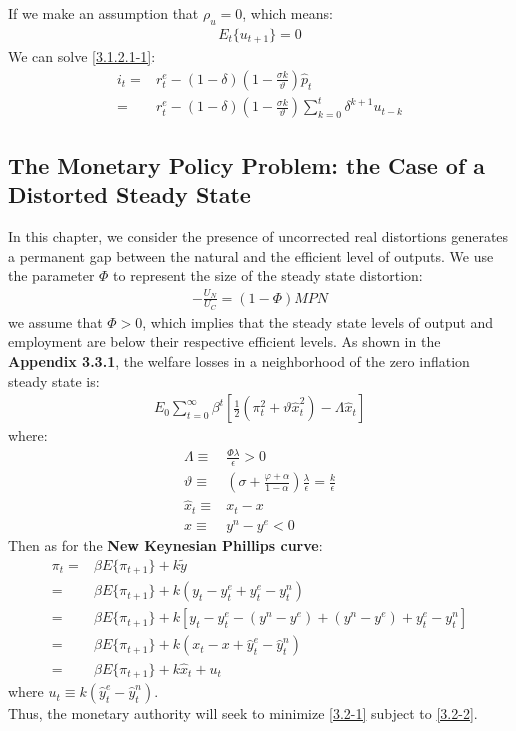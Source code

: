 \documentclass{article}
\numberwithin{equation}{section}
\begin{document}
If we make an assumption that $\rho_u = 0$, which means:
	\begin{align*}
		E_t\{ u_{t+1} \} = 0
	\end{align*}	
We can solve \eqref{3.1.2.1-1}:
	\begin{align*}
		i_t = &r^e_t - (1 - \delta)\left( 1 - \frac{\sigma k}{\vartheta} \right) \hat{p}_t\\
		= &r^e_t - (1 - \delta)\left( 1 - \frac{\sigma k}{\vartheta} \right)\sum\limits^t_{k=0} \delta^{k+1}u_{t-k}
	\end{align*}


\subsection{The Monetary Policy Problem: the Case of a Distorted Steady State}
In this chapter, we consider the presence of uncorrected real distortions generates a permanent gap between the natural and the efficient level of outputs. We use the parameter $\Phi$ to represent the size of the steady state distortion:
	\begin{align*}
		-\frac{U_N}{U_C} = (1 - \Phi)MPN
	\end{align*}
we assume that $\Phi > 0$, which implies that the steady state levels of output and employment are below their respective efficient levels. As shown in the \textbf{Appendix 3.3.1}, the welfare losses in a neighborhood of the zero inflation steady state is:
	\begin{align}
		E_0 \sum\limits^\infty_{t=0} \beta^t \left[ \frac{1}{2}(\pi^2_t + \vartheta \hat{x}^2_t) - \Lambda \hat{x}_t \right] \label{3.2-1}
	\end{align} 
where:
	\begin{align*}
		\Lambda \equiv &\frac{\Phi\lambda}{\epsilon} > 0\\
		\vartheta \equiv &\left( \sigma + \frac{\varphi + \alpha}{1 - \alpha} \right)\frac{\lambda}{\epsilon} = \frac{k}{\epsilon}\\
		\hat{x}_t \equiv &x_t - x\\
		x \equiv & y^n - y^e < 0
	\end{align*}
Then as for the \textbf{New Keynesian Phillips curve}:
	\begin{align}
		\pi_t = &\beta E\{ \pi_{t+1} \} + k\tilde{y} \nonumber\\
		= &\beta E\{ \pi_{t+1} \} + k(y_t - y^e_t + y^e_t - y^n_t) \nonumber\\
		= &\beta E\{ \pi_{t+1} \} + k[y_t - y^e_t - (y^n - y^e) + (y^n - y^e) + y^e_t - y^n_t] \nonumber\\
		= &\beta E\{ \pi_{t+1} \} + k(x_t - x + \hat{y}^e_t - \hat{y}^n_t) \nonumber\\
		= &\beta E\{ \pi_{t+1} \} + k\hat{x}_t + u_t \label{3.2-2}
	\end{align}
where $u_t \equiv k(\hat{y}^e_t - \hat{y}^n_t)$.\\
Thus, the monetary authority will seek to minimize \eqref{3.2-1} subject to \eqref{3.2-2}.
\end{document}
